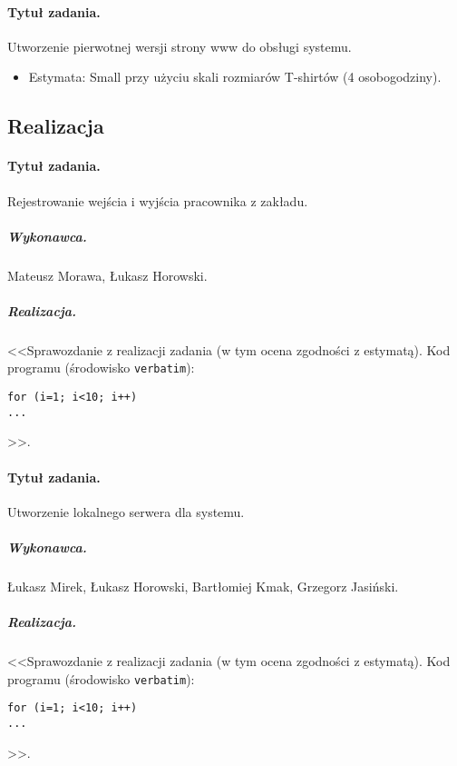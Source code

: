\documentclass[a4paper]{article}
\begin{document}
\paragraph{Tytuł zadania.} Utworzenie pierwotnej wersji strony www do obsługi systemu.
\begin{itemize}
\item Estymata: Small przy użyciu skali rozmiarów T-shirtów (4 osobogodziny).
\end{itemize}

\subsection{Realizacja}

\paragraph{Tytuł zadania.} Rejestrowanie wejścia i wyjścia pracownika z zakładu.
\subparagraph{Wykonawca.} Mateusz Morawa, Łukasz Horowski.
\subparagraph{Realizacja.} <<Sprawozdanie z realizacji zadania (w tym ocena zgodności z estymatą). Kod programu (środowisko \texttt{verbatim}): \begin{verbatim}
for (i=1; i<10; i++)
...
\end{verbatim}>>.

\paragraph{Tytuł zadania.} Utworzenie lokalnego serwera dla systemu.
\subparagraph{Wykonawca.} Łukasz Mirek, Łukasz Horowski, Bartłomiej Kmak, Grzegorz Jasiński.
\subparagraph{Realizacja.} <<Sprawozdanie z realizacji zadania (w tym ocena zgodności z estymatą). Kod programu (środowisko \texttt{verbatim}): \begin{verbatim}
for (i=1; i<10; i++)
...
\end{verbatim}>>.
 
\end{document}
